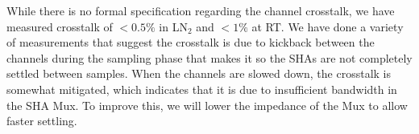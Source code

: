 \label{sec:5.7}


While there is no formal specification regarding the channel crosstalk, we have measured crosstalk of $<0.5\%$ in LN$_2$ and $<1\%$ at RT. We have done a variety of measurements that suggest the crosstalk is due to kickback between the channels during the sampling phase that makes it so the SHAs are not completely settled between samples. When the channels are slowed down, the crosstalk is somewhat mitigated, which indicates that it is due to insufficient bandwidth in the SHA Mux. To improve this, we will lower the impedance of the Mux to allow faster settling.
